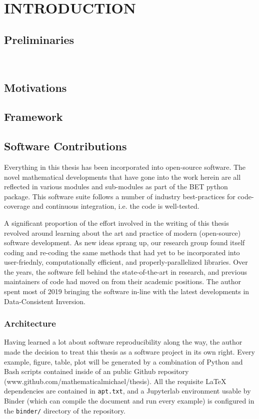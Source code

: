 \chapter{\uppercase{Introduction}} \label{chapter:01}

\section{Preliminaries}

\
\section{Motivations}


\section{Framework}



\section{Software Contributions}
Everything in this thesis has been incorporated into open-source software.
The novel mathematical developments that have gone into the work herein are all reflected in various modules and sub-modules as part of the BET python package.
This software suite follows a number of industry best-practices for code-coverage and continuous integration, i.e. the code is well-tested.

A significant proportion of the effort involved in the writing of this thesis revolved around learning about the art and practice of modern (open-source) software development.
As new ideas sprang up, our research group found itself coding and re-coding the same methods that had yet to be incorporated into user-friednly, computationally efficient, and properly-parallelized libraries.
Over the years, the software fell behind the state-of-the-art in research, and previous maintainers of code had moved on from their academic positions.
The author spent most of 2019 bringing the software in-line with the latest developments in Data-Consistent Inversion.

\subsection{Architecture}
Having learned a lot about software reproducibility along the way, the author made the decision to treat this thesis as a software project in its own right.
Every example, figure, table, plot will be generated by a combination of Python and Bash scripts contained inside of an public Github repository (www.github.com/mathematicalmichael/thesis).
All the requisite LaTeX dependencies are contained in {\tt apt.txt}, and a Jupyterlab environment usable by Binder (which can compile the document and run every example) is configured in the {\tt binder/} directory of the repository.


